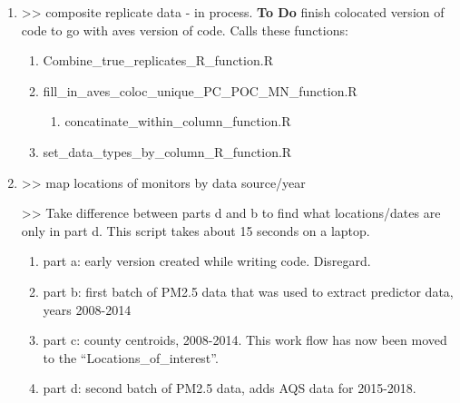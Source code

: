 \begin{enumerate}[nolistsep]



\item {} >> composite replicate data - in process. \textbf{To Do} finish colocated version of code to go with aves version of code. Calls these functions:
  \begin{enumerate}
  \item Combine\_true\_replicates\_R\_function.R
  \item fill\_in\_aves\_coloc\_unique\_PC\_POC\_MN\_function.R
    \begin{enumerate}
    \item concatinate\_within\_column\_function.R
    \end{enumerate}
  \item set\_data\_types\_by\_column\_R\_function.R
  \end{enumerate}
\item {} >> map locations of monitors by data source/year

 >> Take difference between parts d and b to find what locations/dates are only in part d. This script takes about 15 seconds on a laptop. %
\begin{enumerate}
\item part a: early version created while writing code. Disregard.
\item part b: first batch of PM2.5 data that was used to extract predictor data, years 2008-2014
\item part c: county centroids, 2008-2014. This work flow has now been moved to the ``Locations\_of\_interest''.
\item part d: second batch of PM2.5 data, adds AQS data for 2015-2018.


\end{enumerate}
\end{enumerate}

